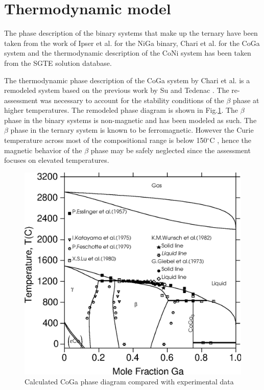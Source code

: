 \documentclass[article]{elsarticle}
\begin{document}
\section{Thermodynamic model}
\label{Sec:thermo_model}
The phase description of the binary systems that make up the ternary have been taken from the work of
Ipser et al. \cite{Ipser04} for the NiGa binary, Chari et al. \cite{Cha10} for the CoGa system and
the thermodynamic description of the CoNi system has been taken from the SGTE solution database.

The thermodynamic phase description of the CoGa system by Chari et al. \cite{Cha10} is a remodeled
system based on the previous work by Su and Tedenac \cite{05Su}. The re-assessment was necessary to
account for the stability conditions of the $\beta$ phase at higher temperatures. The remodeled
phase diagram is shown in Fig.\ref{Model-cal}. The $\beta$ phase in the binary systems is non-magnetic and has been modeled as such.
The $\beta$ phase in the ternary system is known to be ferromagnetic. However the Curie temperature across most of the compositional range is below 150$^{\circ}\mathrm{C}$ \cite{Oik06}, hence the magnetic behavior of the $\beta$ phase may be safely neglected since the assessment focuses on elevated temperatures.
\begin{figure}[!htbp]
\centering 
\includegraphics[scale=0.6]{CoGa_binary}
\caption{Calculated CoGa phase diagram compared with experimental data\cite{Cha10}}
\label{Model-cal}
\end{figure}
\end{document}
